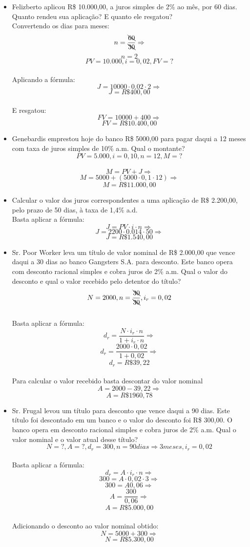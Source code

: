 \documentclass[a4paper, 12pt]{article}
\begin{document}
\begin{itemize}
\item  Felizberto aplicou R\$ 10.000,00, a juros simples de 2\% ao mês, por 60 dias. Quanto rendeu sua aplicação? E quanto ele resgatou? \\
  Convertendo os dias para meses:
  $$ n = \frac{\bcancel{60}}{\bcancel{30}} \Rightarrow $$
  $$ n = 2 $$
  $$ PV = 10.000, i = 0,02, FV=? $$ \\
  Aplicando a fórmula: \\
  $$ J = 10000 \cdot 0.02 \cdot 2 \Rightarrow $$
  $$ \boxed{J = R\$400,00} $$ \\
  E resgatou:
  $$ FV = 10000+400 \Rightarrow $$
  $$ \boxed{FV = R\$10.400,00} $$  
\item Genebardis emprestou  hoje  do  banco  R\$  5000,00 para pagar daqui a 12 meses com taxa de juros simples de 10\% a.m. Qual o montante?
  $$ PV = 5.000, i = 0,10, n = 12, M=? $$ \\
  $$ M = PV + J \Rightarrow $$
  $$ M = 5000 + (5000 \cdot 0,1 \cdot 12) \Rightarrow $$
  $$ \boxed{M = R\$11.000,00} $$ 
\item Calcular o valor dos juros correspondentes a uma aplicação de R\$ 2.200,00, pelo prazo de 50 dias, à taxa de 1,4\% a.d.\\
  Basta aplicar a fórmula:
  $$ J = PV \cdot i \cdot n \Rightarrow $$
  $$ J = 2200 \cdot 0.014 \cdot 50 \Rightarrow $$
  $$ \boxed{J = R\$1.540,00} $$
\item Sr. Poor Worker leva um título de valor nominal de R\$ 2.000,00 que vence daqui a 30 dias ao banco Gangsters S.A. para desconto. Este banco opera com desconto racional simples e cobra juros de 2\% a.m. Qual o valor do desconto e qual o valor recebido pelo detentor do título? \\
  $$ N = 2000, n =\frac{\bcancel{30}}{\bcancel{30}}, i_r = 0,02 $$ \\
  Basta aplicar a fórmula:
  $$ d_r = \frac{N \cdot i_r \cdot n}{1+i_r \cdot n} \Rightarrow $$
  $$ d_r = \frac{2000 \cdot 0,02}{1+0,02} \Rightarrow $$
  $$ \boxed{d_r = R\$39,22} $$ \\
  Para calcular o valor recebido basta descontar do valor nominal \\
  $$ A = 2000 - 39,22 \Rightarrow $$
  $$ \boxed{A = R\$1960,78} $$
\item Sr. Frugal levou um título para desconto que vence daqui a 90 dias. Este título foi descontado em um banco e o  valor  do  desconto  foi  R\$  300,00.  O  banco  opera  em  desconto  racional simples e cobra juros de 2\% a.m. Qual o valor nominal e o valor atual desse título?\\
  $$ N = ?, A = ?, d_r = 300, n = 90 dias \Rightarrow 3 meses, i_r = 0,02 $$ \\
  Basta aplicar a fórmula:
  $$ d_r = A \cdot i_r \cdot n \Rightarrow $$
  $$ 300 = A \cdot 0,02 \cdot 3 \Rightarrow $$
  $$ 300 = A0,06 \Rightarrow $$
  $$ A = \frac{300}{0,06} \Rightarrow $$
  $$ \boxed{A = R\$5.000,00} $$ \\
  Adicionando o desconto ao valor nominal obtido: \\
  $$ N = 5000 + 300 \Rightarrow $$
  $$ \boxed{ N = R\$5.300,00}$$  
  
\end{itemize}
\end{document}
